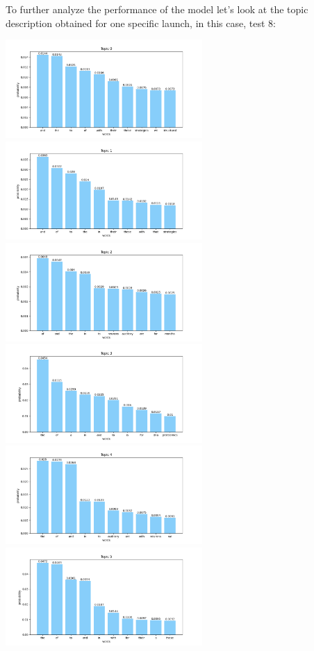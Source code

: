 \documentclass[10pt]{article} %
\begin{document}
	To further analyze the performance of the model let's look at the topic description obtained for one specific launch, in this case, test 8:
	
	\begin{center}
		\includegraphics[width=7.5cm]{images/plots/test_8/topic_0.png}
		\includegraphics[width=7.5cm]{images/plots/test_8/topic_1.png}
		\includegraphics[width=7.5cm]{images/plots/test_8/topic_2.png}
		\includegraphics[width=7.5cm]{images/plots/test_8/topic_3.png}
		\includegraphics[width=7.5cm]{images/plots/test_8/topic_4.png}
		\includegraphics[width=7.5cm]{images/plots/test_8/topic_5.png}

\end{center}
\end{document}
